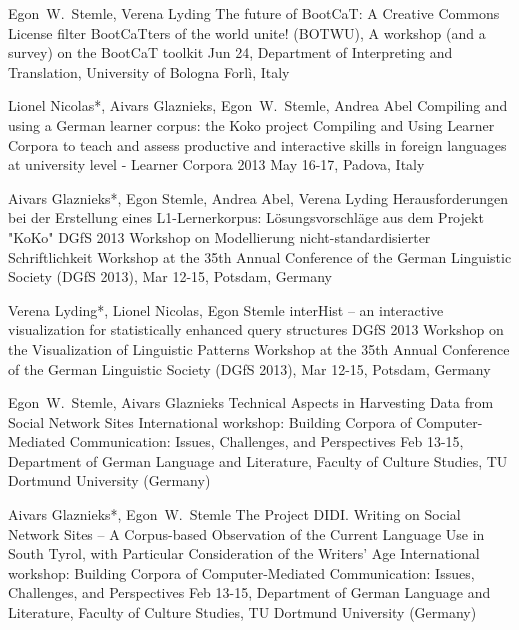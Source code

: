 \documentclass[11pt,a4paper]{moderncv}
\begin{document}
        {Egon~W.~Stemle, Verena Lyding}
        {\small The future of BootCaT: A Creative Commons License filter}
        {\small BootCaTters of the world unite! (BOTWU), A workshop (and a
        survey) on the BootCaT toolkit}
        {\small Jun 24, Department of Interpreting and Translation, University
        of Bologna Forl\`{i}, Italy}
        {}

        {Lionel Nicolas*, Aivars Glaznieks, Egon~W.~Stemle, Andrea Abel}
        {\small Compiling and using a German learner corpus: the Koko project}
        {\small Compiling and Using Learner Corpora to teach and assess
        productive and interactive skills in foreign languages at university
        level - Learner Corpora 2013}
        {\small May 16-17, Padova, Italy}
        {}

        {Aivars Glaznieks*, Egon Stemle, Andrea Abel, Verena Lyding}
        {\small Herausforderungen bei der Erstellung eines L1-Lernerkorpus:
        Lösungsvorschläge aus dem Projekt "KoKo"}
        {\small DGfS 2013 Workshop on Modellierung nicht-standardisierter
        Schriftlichkeit}
        {\small Workshop at the 35th Annual Conference of the German Linguistic
        Society (DGfS 2013), Mar 12-15, Potsdam, Germany}
        {}

        {Verena Lyding*, Lionel Nicolas, Egon Stemle}
        {\small interHist – an interactive visualization for statistically
        enhanced query structures}
        {\small DGfS 2013 Workshop on the Visualization of Linguistic Patterns}
        {\small Workshop at the 35th Annual Conference of the German Linguistic
        Society (DGfS 2013), Mar 12-15, Potsdam, Germany}
        {}

        {Egon~W.~Stemle, Aivars Glaznieks}
        {\small Technical Aspects in Harvesting Data from Social Network Sites}
        {\small International workshop: Building Corpora of Computer-Mediated
        Communication: Issues, Challenges, and Perspectives}
        {\small Feb 13-15, Department of German Language and Literature, Faculty of
        Culture Studies, TU Dortmund University (Germany)}
        {}

        {Aivars Glaznieks*, Egon~W.~Stemle}
        {\small The Project DIDI. Writing on Social Network Sites – A
        Corpus-based Observation of the Current Language Use in South Tyrol,
        with Particular Consideration of the Writers’ Age} 
        {\small International workshop: Building Corpora of Computer-Mediated
        Communication: Issues, Challenges, and Perspectives}
        {\small Feb 13-15, Department of German Language and Literature, Faculty of
        Culture Studies, TU Dortmund University (Germany)}
        {}
\end{document}
